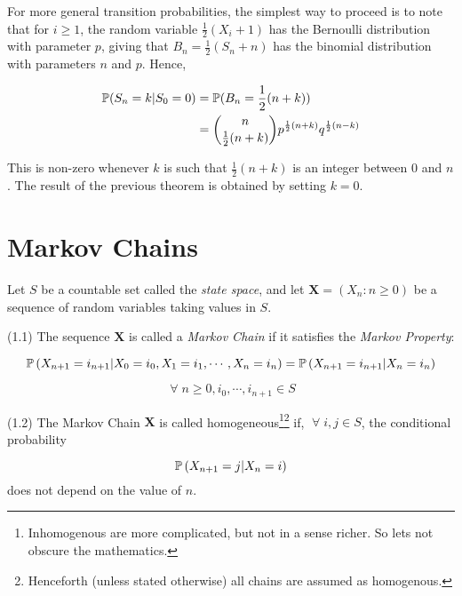 \documentclass[a4paper]{article}
\begin{document}
For more general transition probabilities, the simplest way to proceed is to note that for $ i \geq 1 $, the random variable $ \frac{1}{2} (X_{i} + 1) $ has the Bernoulli distribution with parameter $ p $, giving that $ B_{n} = \frac{1}{2}(S_{n} + n)$ has the binomial distribution with parameters $ n $ and $ p $. Hence,

\begin{align*}
\P(S_{n} = k | S_{0} = 0 )& = \P(B_{n} = \frac{1}{2}(n+k)) \\
& = \binom{n}{\frac{1}{2}(n+k)}p^{\frac{1}{2}(n+k)}q^{\frac{1}{2}(n - k)}
\end{align*} 

This is non-zero whenever $ k $ is such that $ \frac{1}{2}(n+k) $ is an integer between $ 0 $ and $ n $. The result of the previous theorem is obtained by setting $ k = 0 $.

\section{Markov Chains}

Let $ S $ be a countable set called the \emph{state space}, and let $ \mathbf{X} = (X_{n} : n \geq 0) $ be a sequence of random variables taking values in $ S $. 

\begin{defi} (1.1)
	The sequence $ \mathbf{X} $ is called a \emph{Markov Chain} if it satisfies the \emph{Markov Property}:
	
	\[ \P\left( X_{n+1}= i_{n+1} | X_{0} = i_{0},X_{1} = i_{1},\cdots,X_{n} = i_{n} \right) = \P\left(  X_{n+1} = i_{n+1} | X_{n} = i_{n} \right)  \]
	
	\[ \; \forall \;  n \geq 0, i_{0},\cdots,i_{n+1} \in S \]
\end{defi}

\begin{defi} (1.2)
	The Markov Chain $ \mathbf{X} $ is called homogeneous\footnote{Inhomogenous are more complicated, but not in a sense richer. So lets not obscure the mathematics. }\footnote{Henceforth (unless stated otherwise) all chains are assumed as homogenous.} if, $ \; \forall \; i,j \in S $, the conditional probability 
	
	\[ \P\left(  X_{n+1} = j | X_{n} = i \right)  \] does not depend on the value of $ n $.
\end{defi}
\end{document}
